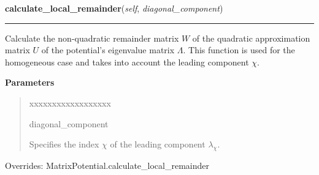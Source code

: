 \hspace{.8\funcindent}\begin{boxedminipage}{\funcwidth}

    \raggedright \textbf{calculate\_local\_remainder}(\textit{self}, \textit{diagonal\_component})

    \vspace{-1.5ex}

    \rule{\textwidth}{0.5\fboxrule}
\setlength{\parskip}{2ex}
    Calculate the non-quadratic remainder matrix $W$ of the quadratic
    approximation matrix $U$ of the potential's eigenvalue matrix
    $\Lambda$. This function is used for the homogeneous
    case and takes into account the leading component
    $\chi$.

\setlength{\parskip}{1ex}
      \textbf{Parameters}
      \vspace{-1ex}

      \begin{quote}
        \begin{Ventry}{xxxxxxxxxxxxxxxxxx}

          \item[diagonal\_component]

          Specifies the index $\chi$ of the leading
          component $\lambda_\chi$.

        \end{Ventry}

      \end{quote}



      Overrides: MatrixPotential.calculate\_local\_remainder

    \end{boxedminipage}

    \vspace{0.5ex}

